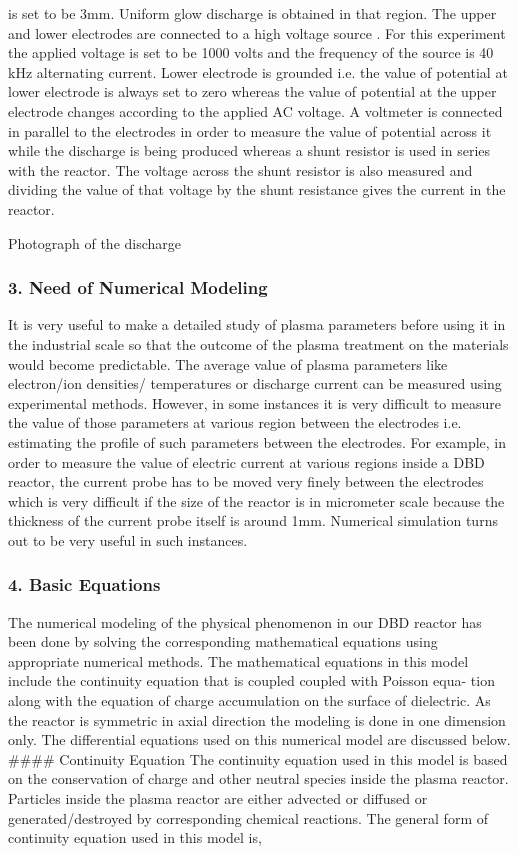 \documentclass[11pt]{article}
\begin{document}
is set to be 3mm. Uniform glow discharge is obtained in that region. The
upper and lower electrodes are connected to a high voltage source . For
this experiment the applied voltage is set to be 1000 volts and the
frequency of the source is 40 kHz alternating current. Lower electrode
is grounded i.e. the value of potential at lower electrode is always set
to zero whereas the value of potential at the upper electrode changes
according to the applied AC voltage. A voltmeter is connected in
parallel to the electrodes in order to measure the value of potential
across it while the discharge is being produced whereas a shunt resistor
is used in series with the reactor. The voltage across the shunt
resistor is also measured and dividing the value of that voltage by the
shunt resistance gives the current in the reactor.

 Photograph of the discharge

    \subsubsection{3. Need of Numerical
Modeling}\label{need-of-numerical-modeling}

It is very useful to make a detailed study of plasma parameters before
using it in the industrial scale so that the outcome of the plasma
treatment on the materials would become predictable. The average value
of plasma parameters like electron/ion densities/ temperatures or
discharge current can be measured using experimental methods. However,
in some instances it is very difficult to measure the value of those
parameters at various region between the electrodes i.e. estimating the
profile of such parameters between the electrodes. For example, in order
to measure the value of electric current at various regions inside a DBD
reactor, the current probe has to be moved very finely between the
electrodes which is very difficult if the size of the reactor is in
micrometer scale because the thickness of the current probe itself is
around 1mm. Numerical simulation turns out to be very useful in such
instances.

    \subsubsection{4. Basic Equations}\label{basic-equations}

The numerical modeling of the physical phenomenon in our DBD reactor has
been done by solving the corresponding mathematical equations using
appropriate numerical methods. The mathematical equations in this model
include the continuity equation that is coupled coupled with Poisson
equa- tion along with the equation of charge accumulation on the surface
of dielectric. As the reactor is symmetric in axial direction the
modeling is done in one dimension only. The differential equations used
on this numerical model are discussed below. \#\#\#\# Continuity
Equation The continuity equation used in this model is based on the
conservation of charge and other neutral species inside the plasma
reactor. Particles inside the plasma reactor are either advected or
diffused or generated/destroyed by corresponding chemical reactions. The
general form of continuity equation used in this model is,
\end{document}

